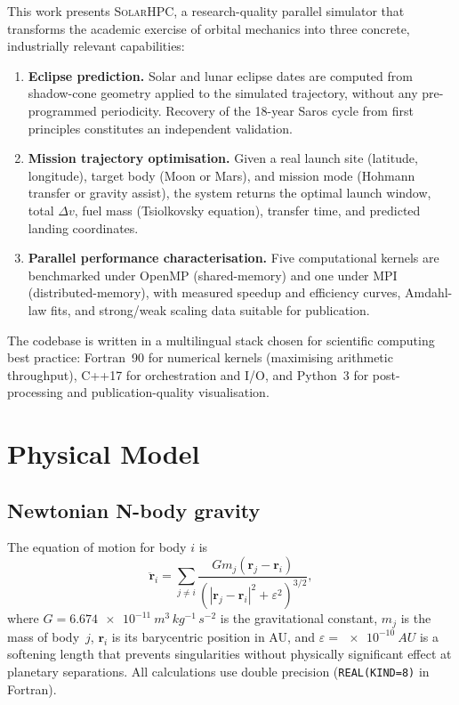 \documentclass[conference]{IEEEtran}
\newcommand{\SOLARHPC}{\textsc{SolarHPC}}
\begin{document}
This work presents \SOLARHPC{}, a research-quality parallel
simulator that transforms the academic exercise of orbital
mechanics into three concrete, industrially relevant
capabilities:

\begin{enumerate}
  \item \textbf{Eclipse prediction.}  Solar and lunar eclipse
    dates are computed from shadow-cone geometry applied to
    the simulated trajectory, without any pre-programmed
    periodicity.  Recovery of the 18-year Saros cycle from
    first principles constitutes an independent validation.

  \item \textbf{Mission trajectory optimisation.}  Given a
    real launch site (latitude, longitude), target body
    (Moon or Mars), and mission mode (Hohmann transfer or
    gravity assist), the system returns the optimal launch
    window, total $\Delta v$, fuel mass (Tsiol\-kov\-sky
    equation), transfer time, and predicted landing
    coordinates.

  \item \textbf{Parallel performance characterisation.}
    Five computational kernels are benchmarked under
    OpenMP (shared-memory) and one under MPI
    (distributed-memory), with measured speedup and
    efficiency curves, Amdahl-law fits, and strong/weak
    scaling data suitable for publication.
\end{enumerate}

The codebase is written in a multilingual stack chosen for
scientific computing best practice: Fortran~90 for numerical
kernels (maximising arithmetic throughput), C++17 for
orchestration and I/O, and Python~3 for post-processing and
publication-quality visualisation.

\section{Physical Model}
\label{sec:physics}

\subsection{Newtonian N-body gravity}

The equation of motion for body $i$ is
\begin{equation}
  \ddot{\mathbf{r}}_i =
    \sum_{j \ne i}
    \frac{G m_j \left(\mathbf{r}_j - \mathbf{r}_i\right)}
         {\left(|\mathbf{r}_j - \mathbf{r}_i|^2 + \varepsilon^2\right)^{3/2}},
  \label{eq:nbody}
\end{equation}
where $G = \SI{6.674e-11}{m^3\,kg^{-1}\,s^{-2}}$ is the
gravitational constant, $m_j$ is the mass of body~$j$,
$\mathbf{r}_i$ is its barycentric position in AU, and
$\varepsilon = \SI{e-10}{AU}$ is a softening length that
prevents singularities without physically significant
effect at planetary separations.  All calculations use
double precision (\texttt{REAL(KIND=8)} in Fortran).
\end{document}
